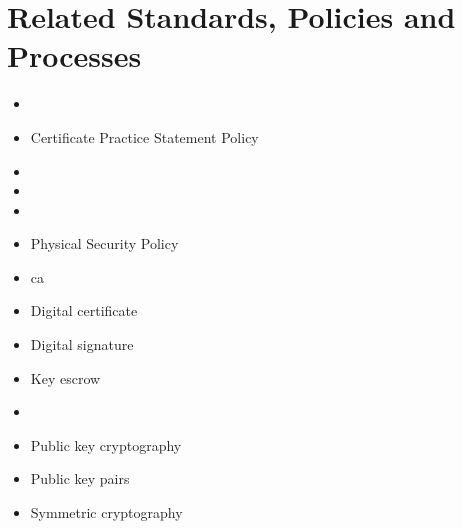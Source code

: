 \section{Related Standards, Policies and Processes}
\begin{itemize}
\item {}%
\item Certificate Practice Statement Policy%
\item {}
\item {}
\item {}
\item Physical Security Policy%
\end{itemize}
\CommonDefinitionsAndTerms
\begin{itemize}
\item \acrfull{ca}
\item Digital certificate
\item Digital signature
\item Key escrow
\item \Plaintext
\item Public key cryptography
\item Public key pairs
\item Symmetric cryptography
\end{itemize}
\CommonRevisionHistory